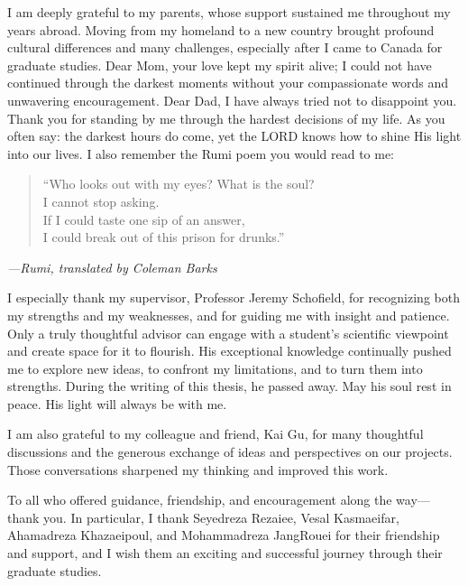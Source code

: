 \documentclass[
  11pt,
  letterpaper,
  onehalfspacing,
  normalmargins,
  equalmargins,
  oneside
]{ut-thesis}
\begin{document}
\begin{acknowledgements}
I am deeply grateful to my parents, whose support sustained me throughout my years abroad. Moving from my homeland to a new country brought profound cultural differences and many challenges, especially after I came to Canada for graduate studies. Dear Mom, your love kept my spirit alive; I could not have continued through the darkest moments without your compassionate words and unwavering encouragement. Dear Dad, I have always tried not to disappoint you. Thank you for standing by me through the hardest decisions of my life. As you often say: the darkest hours do come, yet the LORD knows how to shine His light into our lives. I also remember the Rumi poem you would read to me:
\begin{quote}
``Who looks out with my eyes? What is the soul?\\
I cannot stop asking.\\
If I could taste one sip of an answer,\\
I could break out of this prison for drunks.''
\end{quote}
\begin{flushright}
\emph{---Rumi, translated by Coleman Barks}
\end{flushright}

I especially thank my supervisor, Professor Jeremy Schofield, for recognizing both my strengths and my weaknesses, and for guiding me with insight and patience. Only a truly thoughtful advisor can engage with a student's scientific viewpoint and create space for it to flourish. His exceptional knowledge continually pushed me to explore new ideas, to confront my limitations, and to turn them into strengths. During the writing of this thesis, he passed away. May his soul rest in peace. His light will always be with me.

I am also grateful to my colleague and friend, Kai Gu, for many thoughtful discussions and the generous exchange of ideas and perspectives on our projects. Those conversations sharpened my thinking and improved this work.

To all who offered guidance, friendship, and encouragement along the way---thank you. In particular, I thank Seyedreza Rezaiee, Vesal Kasmaeifar, Ahamadreza Khazaeipoul, and Mohammadreza JangRouei for their friendship and support, and I wish them an exciting and successful journey through their graduate studies.
\end{acknowledgements}
\end{document}
